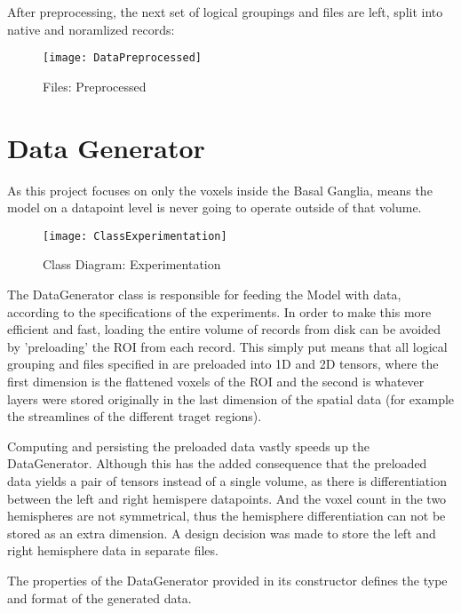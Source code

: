 After preprocessing, the next set of logical groupings and files are left, split into native and noramlized records:

\begin{figure}[H]
\centering
\texttt{[image: DataPreprocessed]}
\caption{Files: Preprocessed}
\label{fig:files}
\end{figure}

\section{Data Generator}

As this project focuses on only the voxels inside the Basal Ganglia, means the model on a datapoint level is never going to operate outside of that volume.

\begin{figure}[H]
\centering
\texttt{[image: ClassExperimentation]}
\caption{Class Diagram: Experimentation}
\end{figure}

The DataGenerator class is responsible for feeding the Model with data, according to the specifications of the experiments. In order to make this more efficient and fast, loading the entire volume of records from disk can be avoided by 'preloading' the \ac{ROI} from each record. This simply put means that all logical grouping and files specified in  are preloaded into 1D and 2D tensors, where the first dimension is the flattened voxels of the \ac{ROI} and the second is whatever layers were stored originally in the last dimension of the spatial data (for example the streamlines of the different traget regions).\par
Computing and persisting the preloaded data vastly speeds up the DataGenerator. Although this has the added consequence that the preloaded data yields a pair of tensors instead of a single volume, as there is differentiation between the left and right hemispere datapoints. And the voxel count in the two hemispheres are not symmetrical, thus the hemisphere differentiation can not be stored as an extra dimension. A design decision was made to store the left and right hemisphere data in separate files.\par
The properties of the DataGenerator provided in its constructor defines the type and format of the generated data.

